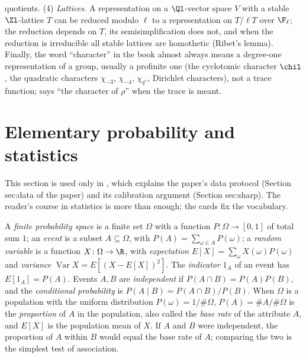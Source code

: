 \begin{remark}
quotients.
(4) \emph{Lattices.} A representation on a $\Ql$-vector space $V$ with a stable $\Zl$-lattice $T$
can be reduced modulo $\ell$ to a representation on $T/\ell T$ over $\F_\ell$; the reduction depends
on $T$, its semisimplification does not, and when the reduction is irreducible all stable lattices
are homothetic (Ribet's lemma).
Finally, the word ``character'' in the book almost always means a degree-one representation of a
group, usually a profinite one (the cyclotomic character $\chil$, the quadratic characters
$\chi_{-3}$, $\chi_{-4}$, $\chi_{q^*}$, Dirichlet characters), not a trace function;  says
``the character of $\rho$'' when the trace is meant.
\end{remark}

\section{Elementary probability and statistics}\label{sec:prereq:stats}

This section is used only in , which explains the paper's data protocol
(Section sec:data of the paper) and its calibration argument (Section sec:sharp). The reader's
course in statistics is more than enough; the cards fix the vocabulary.

\begin{definition}\label{def:prereq:prob}
A \emph{finite probability space} is a finite set $\Omega$ with a function $P\colon\Omega\to[0,1]$
of total sum $1$; an \emph{event} is a subset $A\subseteq\Omega$, with $P(A)=\sum_{\omega\in A}P(\omega)$;
a \emph{random variable} is a function $X\colon\Omega\to\R$, with \emph{expectation}
$E[X]=\sum_\omega X(\omega)P(\omega)$ and \emph{variance} $\operatorname{Var}X=E[(X-E[X])^2]$. The
\emph{indicator} $1_A$ of an event has $E[1_A]=P(A)$. Events $A,B$ are \emph{independent} if
$P(A\cap B)=P(A)P(B)$, and the \emph{conditional probability} is $P(A\mid B)=P(A\cap B)/P(B)$. When
$\Omega$ is a population with the uniform distribution $P(\omega)=1/\#\Omega$, $P(A)=\#A/\#\Omega$
is the \emph{proportion} of $A$ in the population, also called the \emph{base rate} of the
attribute $A$, and $E[X]$ is the population mean of $X$. If $A$ and $B$ were independent, the
proportion of $A$ within $B$ would equal the base rate of $A$; comparing the two is the simplest
test of association.
\end{definition}

